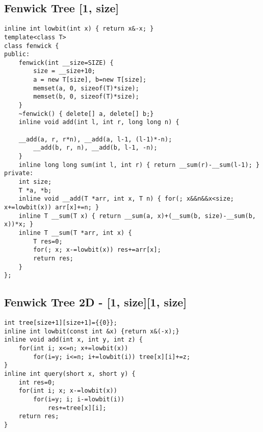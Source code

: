 \documentclass[11pt,twocolumn,a4paper]{article}
\begin{document}
\subsection{Fenwick Tree [1, size]}
\begin{lstlisting}[label=Fenwick Tree]
inline int lowbit(int x) { return x&-x; }
template<class T>
class fenwick {
public:
	fenwick(int __size=SIZE) {
		size = __size+10;
		a = new T[size], b=new T[size];
		memset(a, 0, sizeof(T)*size);
		memset(b, 0, sizeof(T)*size);
	}
	~fenwick() { delete[] a, delete[] b;}
	inline void add(int l, int r, long long n) {

	__add(a, r, r*n), __add(a, l-1, (l-1)*-n);
		__add(b, r, n), __add(b, l-1, -n);
	}
	inline long long sum(int l, int r) { return __sum(r)-__sum(l-1); }
private:
	int size;
	T *a, *b;
	inline void __add(T *arr, int x, T n) { for(; x&&n&&x<size; x+=lowbit(x)) arr[x]+=n; }
	inline T __sum(T x) { return __sum(a, x)+(__sum(b, size)-__sum(b, x))*x; }
	inline T __sum(T *arr, int x) {
		T res=0;
		for(; x; x-=lowbit(x)) res+=arr[x];
		return res;
	}
};
\end{lstlisting}

\subsection{Fenwick Tree 2D - [1, size][1, size]}
\begin{lstlisting}[label=Fenwick Tree 2D]
int tree[size+1][size+1]={{0}};
inline int lowbit(const int &x) {return x&(-x);}
inline void add(int x, int y, int z) {
	for(int i; x<=n; x+=lowbit(x))
		for(i=y; i<=n; i+=lowbit(i)) tree[x][i]+=z;
}
inline int query(short x, short y) {
	int res=0;
	for(int i; x; x-=lowbit(x))
		for(i=y; i; i-=lowbit(i))
			res+=tree[x][i];
	return res;
}
\end{lstlisting}

\newpage
\end{document}
